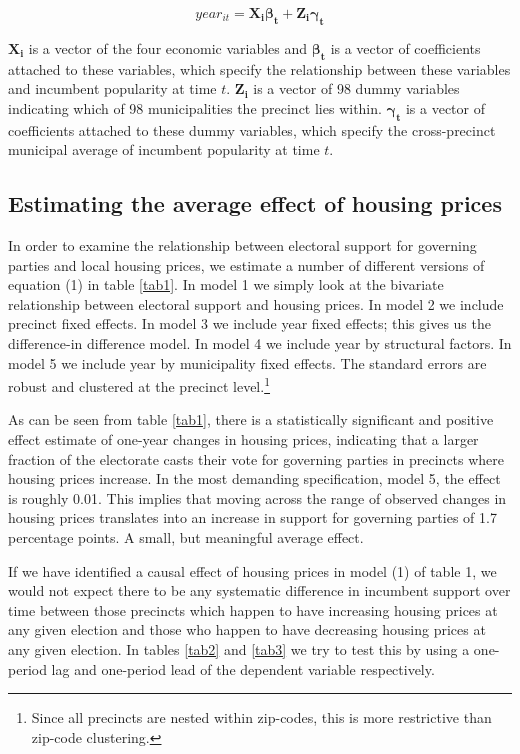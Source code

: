 \documentclass[12pt,a4paper]{article}
\begin{document}
\begin{equation}
year_{it}=\mathbf{X_i\beta_t + Z_i\gamma_t}
\end{equation}

$ \mathbf{X_i}$ is a vector of the four economic variables and $\mathbf{\beta_t}$ is a vector of coefficients attached to these variables, which specify the relationship between these variables and incumbent popularity at time $t$. $\mathbf{Z_i}$ is a vector of 98 dummy variables indicating which of 98 municipalities the precinct lies within. $\mathbf{\gamma_t}$ is a vector of coefficients attached to these dummy variables, which specify the cross-precinct municipal average of incumbent popularity at time $t$.


\subsection{Estimating the average effect of housing prices}
In order to examine the relationship between electoral support for governing parties and local housing prices, we estimate a number of different versions of equation (1) in table \ref{tab1}. In model 1 we simply look at the bivariate relationship between electoral support and housing prices. In model 2 we include precinct fixed effects. In model 3 we include year fixed effects; this gives us the difference-in difference model. In model 4 we include year by structural factors. In model 5 we include year by municipality fixed effects. The standard errors are robust and clustered at the precinct level.\footnote{Since all precincts are nested within zip-codes, this is more restrictive than zip-code clustering.}

As can be seen from table \ref{tab1}, there is a statistically significant and positive effect estimate of one-year changes in housing prices, indicating that a larger fraction of the electorate casts their vote for governing parties in precincts where housing prices increase. In the most demanding specification, model 5, the effect is roughly 0.01.  This implies that moving across the range of observed changes in housing prices translates into an increase in support for  governing parties of 1.7 percentage points. A small, but meaningful average effect.




If we have identified a causal effect of housing prices in model (1) of table 1, we would not expect there to be any systematic difference in incumbent support over time between those precincts which happen to have increasing housing prices at any given election and those who happen to have decreasing housing prices at any given election.  In tables \ref{tab2} and \ref{tab3} we try to test this by using a one-period lag and one-period lead of the dependent variable respectively.
\end{document}
